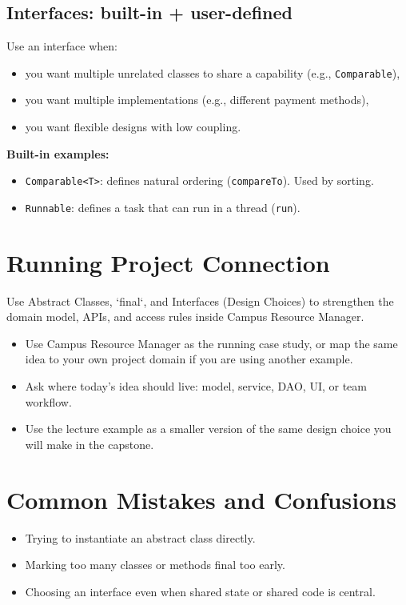 \documentclass[11pt]{article}
\begin{document}
\subsection{Interfaces: built-in + user-defined}
Use an interface when:
\begin{itemize}
  \item you want multiple unrelated classes to share a capability (e.g., \texttt{Comparable}),
  \item you want multiple implementations (e.g., different payment methods),
  \item you want flexible designs with low coupling.
\end{itemize}

\textbf{Built-in examples:}
\begin{itemize}
  \item \texttt{Comparable<T>}: defines natural ordering (\texttt{compareTo}). Used by sorting.
  \item \texttt{Runnable}: defines a task that can run in a thread (\texttt{run}).
\end{itemize}
\notesources{\OOPSUnitIISources}

\section{Running Project Connection}
Use Abstract Classes, `final`, and Interfaces (Design Choices) to strengthen the domain model, APIs, and access rules inside Campus Resource Manager.
\begin{itemize}
  \item Use Campus Resource Manager as the running case study, or map the same idea to your own project domain if you are using another example.
  \item Ask where today's idea should live: model, service, DAO, UI, or team workflow.
  \item Use the lecture example as a smaller version of the same design choice you will make in the capstone.
\end{itemize}
\notesources{\OOPSUnitIISources}

\section{Common Mistakes and Confusions}
\begin{itemize}
  \item Trying to instantiate an abstract class directly.
  \item Marking too many classes or methods final too early.
  \item Choosing an interface even when shared state or shared code is central.
\end{itemize}
\notesources{\OOPSUnitIISources}
\end{document}
